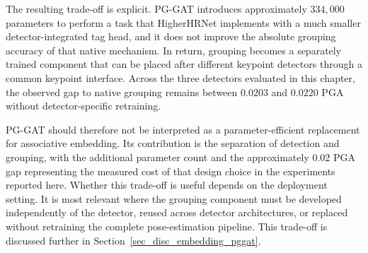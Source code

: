 The resulting trade-off is explicit.
PG-GAT introduces approximately $334{,}000$ parameters to perform
a task that HigherHRNet implements with a much smaller detector-integrated
tag head,
and it does not improve the absolute grouping accuracy of that native
mechanism.
In return, grouping becomes a separately trained component that can
be placed after different keypoint detectors through a common keypoint
interface.
Across the three detectors evaluated in this chapter,
the observed gap to native grouping remains between $0.0203$ and $0.0220$
PGA without detector-specific retraining.

PG-GAT should therefore not be interpreted as a parameter-efficient
replacement for associative embedding.
Its contribution is the separation of detection and grouping,
with the additional parameter count and the approximately $0.02$ PGA gap
representing the measured cost of that design choice in the experiments
reported here.
Whether this trade-off is useful depends on the deployment setting.
It is most relevant where the grouping component must be developed
independently of the detector,
reused across detector architectures,
or replaced without retraining the complete pose-estimation pipeline.
This trade-off is discussed further in
Section~\ref{sec_disc_embedding_pggat}.